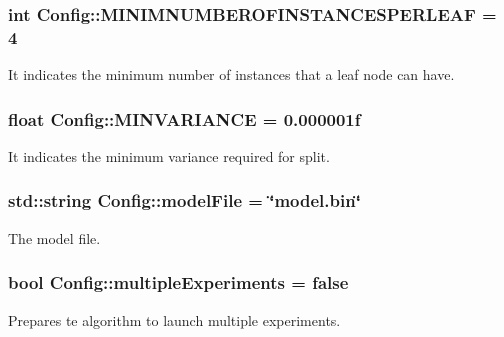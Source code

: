 \subsubsection[{M\+I\+N\+I\+M\+N\+U\+M\+B\+E\+R\+O\+F\+I\+N\+S\+T\+A\+N\+C\+E\+S\+P\+E\+R\+L\+E\+A\+F}]{\setlength{\rightskip}{0pt plus 5cm}int Config\+::\+M\+I\+N\+I\+M\+N\+U\+M\+B\+E\+R\+O\+F\+I\+N\+S\+T\+A\+N\+C\+E\+S\+P\+E\+R\+L\+E\+A\+F = 4\hspace{0.3cm}{\ttfamily [static]}}\label{class_config_addc209f97d86cae197637442bff9fcd8}
It indicates the minimum number of instances that a leaf node can have. \hypertarget{class_config_a547f053c22fce9ac721b3ca87fa7b480}{}
\subsubsection[{M\+I\+N\+V\+A\+R\+I\+A\+N\+C\+E}]{\setlength{\rightskip}{0pt plus 5cm}float Config\+::\+M\+I\+N\+V\+A\+R\+I\+A\+N\+C\+E = 0.\+000001f\hspace{0.3cm}{\ttfamily [static]}}\label{class_config_a547f053c22fce9ac721b3ca87fa7b480}
It indicates the minimum variance required for split. \hypertarget{class_config_a09d132272852d628f1c2bbf78e221df7}{}
\subsubsection[{model\+File}]{\setlength{\rightskip}{0pt plus 5cm}std\+::string Config\+::model\+File = \char`\"{}model.\+bin\char`\"{}\hspace{0.3cm}{\ttfamily [static]}}\label{class_config_a09d132272852d628f1c2bbf78e221df7}
The model file. \hypertarget{class_config_aac65af86410e8a7f24a6eefa118a5f95}{}
\subsubsection[{multiple\+Experiments}]{\setlength{\rightskip}{0pt plus 5cm}bool Config\+::multiple\+Experiments = false\hspace{0.3cm}{\ttfamily [static]}}\label{class_config_aac65af86410e8a7f24a6eefa118a5f95}
Prepares te algorithm to launch multiple experiments. \hypertarget{class_config_a32d7d1aeb9a464a3f63a6b9b7f1806cf}{}
